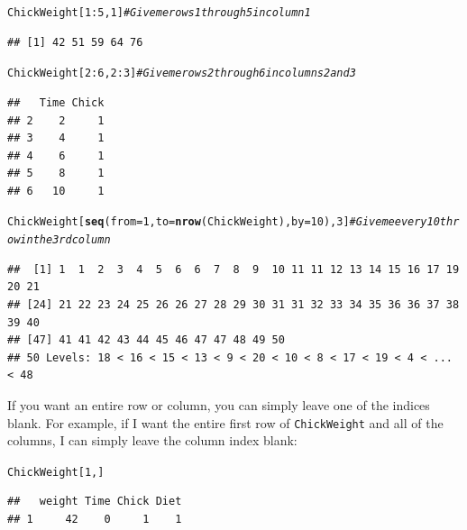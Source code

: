 \documentclass{tufte-book}\usepackage[]{graphicx}\usepackage[]{color}
\makeatletter
\newcommand{\hlnum}[1]{\textcolor[rgb]{0.686,0.059,0.569}{#1}}%
\newcommand{\hlcom}[1]{\textcolor[rgb]{0.678,0.584,0.686}{\textit{#1}}}%
\newcommand{\hlopt}[1]{\textcolor[rgb]{0,0,0}{#1}}%
\newcommand{\hlstd}[1]{\textcolor[rgb]{0.345,0.345,0.345}{#1}}%
\newcommand{\hlkwc}[1]{\textcolor[rgb]{0.333,0.667,0.333}{#1}}%
\newcommand{\hlkwd}[1]{\textcolor[rgb]{0.737,0.353,0.396}{\textbf{#1}}}%
\newenvironment{kframe}{%
 \def\at@end@of@kframe{}%
 \ifinner\ifhmode%
  \def\at@end@of@kframe{\end{minipage}}%
  \begin{minipage}{\columnwidth}%
 \fi\fi%
 \def\FrameCommand##1{\hskip\@totalleftmargin \hskip-\fboxsep
 \colorbox{shadecolor}{##1}\hskip-\fboxsep
     \hskip-\linewidth \hskip-\@totalleftmargin \hskip\columnwidth}%
 \MakeFramed {\advance\hsize-\width
   \@totalleftmargin\z@ \linewidth\hsize
   \@setminipage}}%
 {\par\unskip\endMakeFramed%
 \at@end@of@kframe}
\newenvironment{knitrout}{}{} %
\makeatother
\begin{document}
\begin{footnotesize}
\begin{footnotesize}
\begin{knitrout}
\color{fgcolor}\begin{kframe}
\begin{alltt}
\hlstd{ChickWeight[}\hlnum{1}\hlopt{:}\hlnum{5}\hlstd{,} \hlnum{1}\hlstd{]} \hlcom{# Give me rows 1 through 5 in column 1}
\end{alltt}
\begin{verbatim}
## [1] 42 51 59 64 76
\end{verbatim}
\begin{alltt}
\hlstd{ChickWeight[}\hlnum{2}\hlopt{:}\hlnum{6}\hlstd{,} \hlnum{2}\hlopt{:}\hlnum{3}\hlstd{]} \hlcom{# Give me rows 2 through 6 in columns 2 and 3}
\end{alltt}
\begin{verbatim}
##   Time Chick
## 2    2     1
## 3    4     1
## 4    6     1
## 5    8     1
## 6   10     1
\end{verbatim}
\begin{alltt}
\hlstd{ChickWeight[}\hlkwd{seq}\hlstd{(}\hlkwc{from} \hlstd{=} \hlnum{1}\hlstd{,} \hlkwc{to} \hlstd{=} \hlkwd{nrow}\hlstd{(ChickWeight),} \hlkwc{by} \hlstd{=} \hlnum{10}\hlstd{),} \hlnum{3}\hlstd{]} \hlcom{# Give me every 10th row in the 3rd column}
\end{alltt}
\begin{verbatim}
##  [1] 1  1  2  3  4  5  6  6  7  8  9  10 11 11 12 13 14 15 16 17 19 20 21
## [24] 21 22 23 24 25 26 26 27 28 29 30 31 31 32 33 34 35 36 36 37 38 39 40
## [47] 41 41 42 43 44 45 46 47 47 48 49 50
## 50 Levels: 18 < 16 < 15 < 13 < 9 < 20 < 10 < 8 < 17 < 19 < 4 < ... < 48
\end{verbatim}
\end{kframe}
\end{knitrout}
\end{footnotesize}

If you want an entire row or column, you can simply leave one of the indices blank. For example, if I want the entire first row of \texttt{ChickWeight} and all of the columns, I can simply leave the column index blank:

\begin{footnotesize}
\begin{knitrout}
\color{fgcolor}\begin{kframe}
\begin{alltt}
\hlstd{ChickWeight[}\hlnum{1}\hlstd{,]}
\end{alltt}
\begin{verbatim}
##   weight Time Chick Diet
## 1     42    0     1    1
\end{verbatim}
\end{kframe}
\end{knitrout}
\end{footnotesize}


\end{footnotesize}
\end{document}
